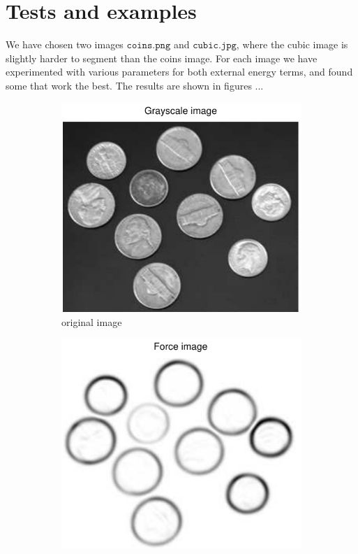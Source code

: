 \documentclass[11pt,a4paper]{article}
\begin{document}
\section{Tests and examples}
%
We have chosen two images $\texttt{coins.png}$ and $\texttt{cubic.jpg}$, where the cubic image is slightly harder to segment than the coins image. For each image we have experimented with various parameters for both external energy terms, and found some that work the best. The results are shown in figures ...
%
\begin{figure}[H]
    \centering
    \begin{subfigure}[t]{0.21\textwidth}
        \includegraphics[width=\textwidth]{src/images/coins_gradient_gray.pdf}
        \caption{original image}
        \label{fig:coins_original}
    \end{subfigure}
    \begin{subfigure}[t]{0.21\textwidth}
        \includegraphics[width=\textwidth]{src/images/coins_gradient_forces.pdf}

\end{subfigure}
\end{figure}
\end{document}
